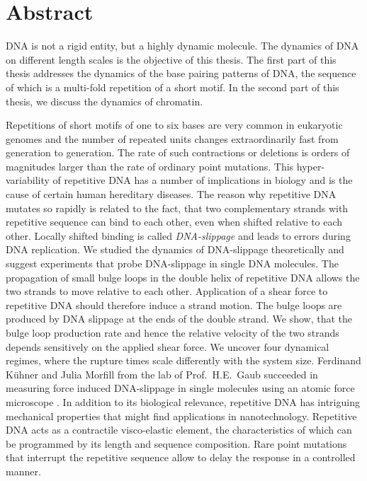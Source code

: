 

\chapter*{Abstract}
DNA is not a rigid entity, but a highly dynamic molecule. The dynamics of DNA on different
length scales is the objective of this thesis. The first part of this thesis
addresses the dynamics of the base pairing patterns of DNA, the sequence of which is a multi-fold
repetition of a short motif. In the second part of this thesis, we discuss the dynamics of chromatin.

Repetitions of short motifs of one to six bases are very common in eukaryotic genomes and the 
number of repeated units changes extraordinarily fast
from generation to generation. The rate of such contractions or deletions is orders of magnitudes
larger than the rate of ordinary point mutations. This hyper-variability of repetitive DNA has a number 
of implications in biology and is the cause of certain human hereditary diseases. 
The reason why repetitive DNA mutates so rapidly is related to the fact, that two complementary
strands with repetitive sequence can bind to each other, even when shifted relative to each other.
Locally shifted binding is called \emph{DNA-slippage} and leads to errors during DNA replication. 
We studied the dynamics of DNA-slippage theoretically and suggest experiments that probe
DNA-slippage in single DNA molecules. The propagation of small bulge loops in the double
helix of repetitive DNA allows the two strands to move relative to each other. Application of 
a shear force to repetitive DNA should therefore induce a strand motion. The 
bulge loops are produced by DNA slippage at the ends of the double strand. We show, that the
bulge loop production rate and hence the relative velocity of the two strands depends sensitively
on the applied shear force. We uncover four dynamical regimes, where the rupture times scale
differently with the system size. Ferdinand K\"uhner and Julia Morfill from the lab of Prof.~H.E.~Gaub
succeeded in measuring force induced DNA-slippage in single molecules using an atomic force
microscope \cite{Kuehner_BiophysJ_07}. In addition to its biological relevance, repetitive DNA 
has intriguing mechanical properties that might find applications in nanotechnology. Repetitive DNA
acts as a contractile visco-elastic element, the characteristics of which can be programmed by
its length and sequence composition. Rare point mutations that interrupt the repetitive sequence allow
to delay the response in a controlled manner.

